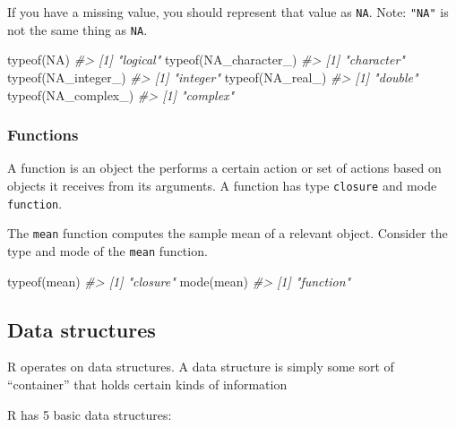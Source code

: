 \documentclass[
]{article}
\newenvironment{Shaded}{\begin{snugshade}}{\end{snugshade}}
\newcommand{\CommentTok}[1]{\textcolor[rgb]{0.56,0.35,0.01}{\textit{#1}}}
\newcommand{\ConstantTok}[1]{\textcolor[rgb]{0.00,0.00,0.00}{#1}}
\newcommand{\FunctionTok}[1]{\textcolor[rgb]{0.00,0.00,0.00}{#1}}
\newcommand{\NormalTok}[1]{#1}
\begin{document}
If you have a missing value, you should represent that value as
\texttt{NA}. Note: \texttt{"NA"} is not the same thing as \texttt{NA}.

\begin{Shaded}
\begin{Highlighting}[]
\FunctionTok{typeof}\NormalTok{(}\ConstantTok{NA}\NormalTok{)}
\CommentTok{\#\textgreater{} [1] "logical"}
\FunctionTok{typeof}\NormalTok{(}\ConstantTok{NA\_character\_}\NormalTok{)}
\CommentTok{\#\textgreater{} [1] "character"}
\FunctionTok{typeof}\NormalTok{(}\ConstantTok{NA\_integer\_}\NormalTok{)}
\CommentTok{\#\textgreater{} [1] "integer"}
\FunctionTok{typeof}\NormalTok{(}\ConstantTok{NA\_real\_}\NormalTok{)}
\CommentTok{\#\textgreater{} [1] "double"}
\FunctionTok{typeof}\NormalTok{(}\ConstantTok{NA\_complex\_}\NormalTok{)}
\CommentTok{\#\textgreater{} [1] "complex"}
\end{Highlighting}
\end{Shaded}

\hypertarget{functions}{%
\subsubsection{Functions}\label{functions}}

A function is an object the performs a certain action or set of actions
based on objects it receives from its arguments. A function has type
\texttt{closure} and mode \texttt{function}.

The \texttt{mean} function computes the sample mean of a relevant
object. Consider the type and mode of the \texttt{mean} function.

\begin{Shaded}
\begin{Highlighting}[]
\FunctionTok{typeof}\NormalTok{(mean)}
\CommentTok{\#\textgreater{} [1] "closure"}
\FunctionTok{mode}\NormalTok{(mean)}
\CommentTok{\#\textgreater{} [1] "function"}
\end{Highlighting}
\end{Shaded}

\hypertarget{data-structures}{%
\subsection{Data structures}\label{data-structures}}

R operates on data structures. A data structure is simply some sort of
``container'' that holds certain kinds of information

R has 5 basic data structures:
\end{document}
